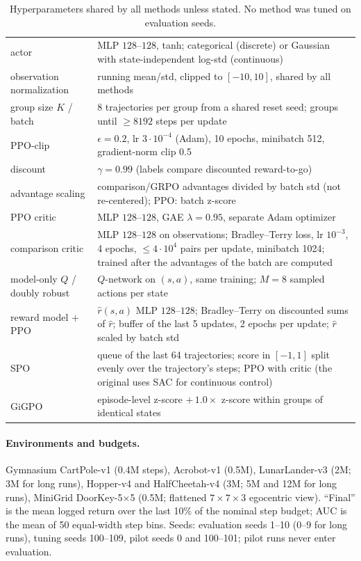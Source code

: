 \documentclass[11pt]{article}
\theoremstyle{remark}
\begin{document}
\begin{table}[h]
\centering
\caption{Hyperparameters shared by all methods unless stated. No method was tuned on evaluation seeds.}
\label{tab:hparams}
\small
\begin{tabular}{p{3.6cm}p{11.6cm}}
\toprule
actor & MLP $128$--$128$, tanh; categorical (discrete) or Gaussian with state-independent log-std (continuous) \\
observation normalization & running mean/std, clipped to $[-10,10]$, shared by all methods \\
group size $K$ / batch & 8 trajectories per group from a shared reset seed; groups until $\ge 8192$ steps per update \\
PPO-clip & $\epsilon=0.2$, lr $3\cdot10^{-4}$ (Adam), 10 epochs, minibatch 512, gradient-norm clip 0.5 \\
discount & $\gamma=0.99$ (labels compare discounted reward-to-go) \\
advantage scaling & comparison/GRPO advantages divided by batch std (not re-centered); PPO: batch z-score \\
PPO critic & MLP $128$--$128$, GAE $\lambda=0.95$, separate Adam optimizer \\
comparison critic & MLP $128$--$128$ on observations; Bradley--Terry loss, lr $10^{-3}$, 4 epochs, $\le 4\cdot10^4$ pairs per update, minibatch 1024; trained after the advantages of the batch are computed \\
model-only $Q$ / doubly robust & $Q$-network on $(s,a)$, same training; $M=8$ sampled actions per state \\
reward model + PPO & $\hat r(s,a)$ MLP $128$--$128$; Bradley--Terry on discounted sums of $\hat r$; buffer of the last 5 updates, 2 epochs per update; $\hat r$ scaled by batch std \\
SPO & queue of the last 64 trajectories; score in $[-1,1]$ split evenly over the trajectory's steps; PPO with critic (the original uses SAC for continuous control) \\
GiGPO & episode-level z-score $+\,1.0\times$ z-score within groups of identical states \\
\bottomrule
\end{tabular}
\end{table}

\paragraph{Environments and budgets.} Gymnasium CartPole-v1 (0.4M steps), Acrobot-v1 (0.5M), LunarLander-v3 (2M; 3M for long runs), Hopper-v4 and HalfCheetah-v4 (3M; 5M and 12M for long runs), MiniGrid DoorKey-5$\times$5 (0.5M; flattened $7\times7\times3$ egocentric view). ``Final'' is the mean logged return over the last 10\% of the nominal step budget; AUC is the mean of 50 equal-width step bins. Seeds: evaluation seeds 1--10 (0--9 for long runs), tuning seeds 100--109, pilot seeds 0 and 100--101; pilot runs never enter evaluation.
\end{document}
